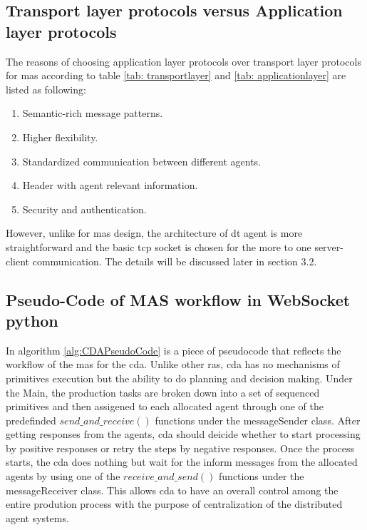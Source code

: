 \subsection{Transport layer protocols versus Application layer protocols}
The reasons of choosing application layer protocols over transport layer protocols for \gls{mas} according to table \ref{tab: transportlayer} and \ref{tab: applicationlayer} are listed as following:
\begin{enumerate}
    \item Semantic-rich message patterns. 
    \item Higher flexibility.
    \item Standardized communication between different agents.
    \item Header with agent relevant information.
    \item Security and authentication.
    \end{enumerate}
However, unlike for \gls{mas} design, the architecture of \gls{dt} agent is more straightforward and the basic \gls{tcp} socket is chosen for the more to one server-client communication. 
The details will be discussed later in section 3.2.

\subsection{Pseudo-Code of MAS workflow in WebSocket python}
In algorithm \ref{alg:CDAPseudoCode} is a piece of pseudocode that reflects the workflow of the \gls{mas} for the \gls{cda}. 
Unlike other \gls{ras}, \gls{cda} has no mechanisms of primitives execution but the ability to do planning and decision making. 
Under the Main, the production tasks are broken down into a set of sequenced primitives and then assigened to each allocated agent through one of the predefinded $send\_and\_receive()$ functions under the messageSender class.
After getting responses from the agents, \gls{cda} should deicide whether to start processing by positive responses or retry the steps by negative responses.  
Once the process starts, the \gls{cda} does nothing but wait for the inform messages from the allocated agents by using one of the $receive\_and\_send()$ functions under the messageReceiver class. 
This allows \gls{cda} to have an overall control among the entire prodution process with the purpose of centralization of the distributed agent systems.  


